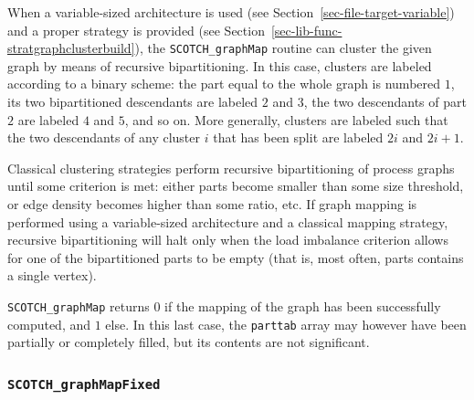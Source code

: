 \begin{itemize}
When a variable-sized architecture is used (see
Section~\ref{sec-file-target-variable}) and a proper strategy is
provided (see Section~\ref{sec-lib-func-stratgraphclusterbuild}),
the {\tt SCOTCH\_graph\lbt Map} routine can cluster
the given graph by means of recursive bipartitioning.
In this case, clusters are labeled according to a binary scheme: the
part equal to the whole graph is numbered $1$, its two bipartitioned
descendants are labeled $2$ and $3$, the two descendants of part $2$
are labeled $4$ and $5$, and so on. More generally, clusters are
labeled such that the two descendants of any cluster $i$ that has been
split are labeled $2i$ and $2i + 1$.

Classical clustering strategies perform recursive bipartitioning of
process graphs until some criterion is met: either parts become
smaller than some size threshold, or edge density becomes higher than
some ratio, etc. If graph mapping is performed using a variable-sized
architecture and a classical mapping strategy, recursive
bipartitioning will halt only when the load imbalance criterion allows
for one of the bipartitioned parts to be empty (that is, most often,
parts contains a single vertex).

\progret

{\tt SCOTCH\_graphMap} returns $0$ if the mapping of the graph has
been successfully computed, and $1$ else. In this last case, the
{\tt parttab} array may however have been partially or completely
filled, but its contents are not significant.
\end{itemize}

\subsubsection{{\tt SCOTCH\_graphMapFixed}}
\label{sec-lib-func-graphmapfixed}

